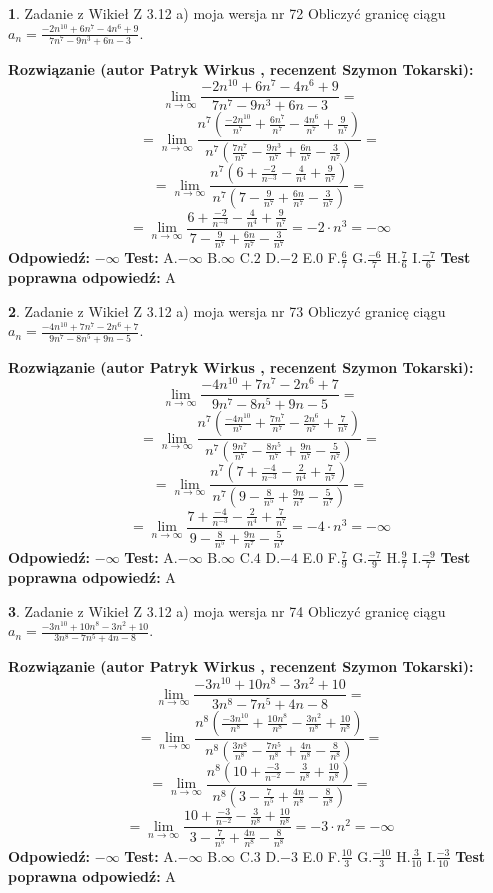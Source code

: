 \documentclass[12pt, a4paper]{article}
\theoremstyle{definition} %
\newtheorem{zad}{}
\newcommand{\zadStart}[1]{\begin{zad}#1\newline}
\newcommand{\zadStop}{\end{zad}}
\newcommand{\rozwStart}[2]{\noindent \textbf{Rozwiązanie (autor #1 , recenzent #2): }\newline}
\newcommand{\rozwStop}{\newline}
\newcommand{\odpStart}{\noindent \textbf{Odpowiedź:}\newline}
\newcommand{\odpStop}{\newline}
\newcommand{\testStart}{\noindent \textbf{Test:}\newline}
\newcommand{\testStop}{\newline}
\newcommand{\kluczStart}{\noindent \textbf{Test poprawna odpowiedź:}\newline}
\newcommand{\kluczStop}{\newline}
\begin{document}
\zadStart{Zadanie z Wikieł Z 3.12 a) moja wersja nr 72}
Obliczyć granicę ciągu $a_{n}=\frac{-2n^{10}+6n^{7}-4n^{6}+9}{7n^{7}-9n^{3}+6n-3}$.
\zadStop
\rozwStart{Patryk Wirkus}{Szymon Tokarski}
$$\lim\limits_{n\to\infty}\frac{-2n^{10}+6n^{7}-4n^{6}+9}{7n^{7}-9n^{3}+6n-3}=$$
$$=\lim\limits_{n\to\infty}\frac{n^{7}\left(\frac{-2n^{10}}{n^{7}}+\frac{6n^{7}}{n^{7}}-\frac{4n^{6}}{n^{7}}+\frac{9}{n^{7}}\right)}{n^{7}\left(\frac{7n^{7}}{n^{7}}-\frac{9n^{3}}{n^{7}}+\frac{6n}{n^{7}}-\frac{3}{n^{7}}\right)}=$$
$$=\lim\limits_{n\to\infty}\frac{n^{7}\left(6+\frac{-2}{n^{-3}}-\frac{4}{n^{4}}+\frac{9}{n^{7}}\right)}
{n^{7}\left(7-\frac{9}{n^{7}}+\frac{6n}{n^{7}}-\frac{3}{n^{7}}\right)}=$$
$$=\lim\limits_{n\to\infty}\frac{6+\frac{-2}{n^{-3}}-\frac{4}{n^{4}}+\frac{9}{n^{7}}}{7-\frac{9}{n^{7}}+\frac{6n}{n^{7}}-\frac{3}{n^{7}}}=-2\cdot n^{3} = -\infty$$
\rozwStop
\odpStart
$-\infty$
\odpStop
\testStart
A.$-\infty$
B.$\infty$
C.$2$
D.$-2$
E.$0$
F.$\frac{6}{7}$
G.$\frac{-6}{7}$
H.$\frac{7}{6}$
I.$\frac{-7}{6}$
\testStop
\kluczStart
A
\kluczStop



\zadStart{Zadanie z Wikieł Z 3.12 a) moja wersja nr 73}
Obliczyć granicę ciągu $a_{n}=\frac{-4n^{10}+7n^{7}-2n^{6}+7}{9n^{7}-8n^{5}+9n-5}$.
\zadStop
\rozwStart{Patryk Wirkus}{Szymon Tokarski}
$$\lim\limits_{n\to\infty}\frac{-4n^{10}+7n^{7}-2n^{6}+7}{9n^{7}-8n^{5}+9n-5}=$$
$$=\lim\limits_{n\to\infty}\frac{n^{7}\left(\frac{-4n^{10}}{n^{7}}+\frac{7n^{7}}{n^{7}}-\frac{2n^{6}}{n^{7}}+\frac{7}{n^{7}}\right)}{n^{7}\left(\frac{9n^{7}}{n^{7}}-\frac{8n^{5}}{n^{7}}+\frac{9n}{n^{7}}-\frac{5}{n^{7}}\right)}=$$
$$=\lim\limits_{n\to\infty}\frac{n^{7}\left(7+\frac{-4}{n^{-3}}-\frac{2}{n^{4}}+\frac{7}{n^{7}}\right)}
{n^{7}\left(9-\frac{8}{n^{5}}+\frac{9n}{n^{7}}-\frac{5}{n^{7}}\right)}=$$
$$=\lim\limits_{n\to\infty}\frac{7+\frac{-4}{n^{-3}}-\frac{2}{n^{4}}+\frac{7}{n^{7}}}{9-\frac{8}{n^{5}}+\frac{9n}{n^{7}}-\frac{5}{n^{7}}}=-4\cdot n^{3} = -\infty$$
\rozwStop
\odpStart
$-\infty$
\odpStop
\testStart
A.$-\infty$
B.$\infty$
C.$4$
D.$-4$
E.$0$
F.$\frac{7}{9}$
G.$\frac{-7}{9}$
H.$\frac{9}{7}$
I.$\frac{-9}{7}$
\testStop
\kluczStart
A
\kluczStop



\zadStart{Zadanie z Wikieł Z 3.12 a) moja wersja nr 74}
Obliczyć granicę ciągu $a_{n}=\frac{-3n^{10}+10n^{8}-3n^{2}+10}{3n^{8}-7n^{5}+4n-8}$.
\zadStop
\rozwStart{Patryk Wirkus}{Szymon Tokarski}
$$\lim\limits_{n\to\infty}\frac{-3n^{10}+10n^{8}-3n^{2}+10}{3n^{8}-7n^{5}+4n-8}=$$
$$=\lim\limits_{n\to\infty}\frac{n^{8}\left(\frac{-3n^{10}}{n^{8}}+\frac{10n^{8}}{n^{8}}-\frac{3n^{2}}{n^{8}}+\frac{10}{n^{8}}\right)}{n^{8}\left(\frac{3n^{8}}{n^{8}}-\frac{7n^{5}}{n^{8}}+\frac{4n}{n^{8}}-\frac{8}{n^{8}}\right)}=$$
$$=\lim\limits_{n\to\infty}\frac{n^{8}\left(10+\frac{-3}{n^{-2}}-\frac{3}{n^{8}}+\frac{10}{n^{8}}\right)}
{n^{8}\left(3-\frac{7}{n^{5}}+\frac{4n}{n^{8}}-\frac{8}{n^{8}}\right)}=$$
$$=\lim\limits_{n\to\infty}\frac{10+\frac{-3}{n^{-2}}-\frac{3}{n^{8}}+\frac{10}{n^{8}}}{3-\frac{7}{n^{5}}+\frac{4n}{n^{8}}-\frac{8}{n^{8}}}=-3\cdot n^{2} = -\infty$$
\rozwStop
\odpStart
$-\infty$
\odpStop
\testStart
A.$-\infty$
B.$\infty$
C.$3$
D.$-3$
E.$0$
F.$\frac{10}{3}$
G.$\frac{-10}{3}$
H.$\frac{3}{10}$
I.$\frac{-3}{10}$
\testStop
\kluczStart
A
\kluczStop
\end{document}
